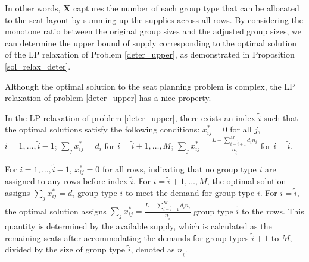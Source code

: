 In other words, $\bm{X}$ captures the number of each group type that can be allocated to the seat layout by summing up the supplies across all rows. By considering the monotone ratio between the original group sizes and the adjusted group sizes, we can determine the upper bound of supply corresponding to the optimal solution of the LP relaxation of Problem \eqref{deter_upper}, as demonstrated in Proposition \ref{sol_relax_deter}.





Although the optimal solution to the seat planning problem is complex, the LP relaxation of problem \eqref{deter_upper} has a nice property.

\begin{prop}\label{sol_relax_deter}
In the LP relaxation of problem \eqref{deter_upper}, there exists an index $\tilde{i}$ such that the optimal solutions satisfy the following conditions: $x_{ij}^{*} = 0$ for all $j$, $i = 1,\ldots, \tilde{i}-1$; $\sum_{j} x_{ij}^{*} = d_{i}$ for $i = \tilde{i}+1,\ldots, M$; $\sum_{j} x_{ij}^{*} = \frac{L - \sum_{i = \tilde{i}+1}^{M} {d_i n_i}}{n_{\tilde{i}}}$ for $i = \tilde{i}$.
\end{prop}


For $i = 1,\ldots, \tilde{i}-1$, $x_{ij}^{*} = 0$ for all rows, indicating that no group type $i$ are assigned to any rows before index $\tilde{i}$. For $i = \tilde{i}+1,\ldots, M$, the optimal solution assigns $\sum_{j} x_{ij}^{*} = d_{i}$ group type $i$ to meet the demand for group type $i$. For $i = \tilde{i}$, the optimal solution assigns $\sum_{j} x_{ij}^{*} = \frac{L - \sum_{i = \tilde{i}+1}^{M} {d_i n_i}}{n_{\tilde{i}}}$ group type $\tilde{i}$ to the rows. This quantity is determined by the available supply, which is calculated as the remaining seats after accommodating the demands for group types $\tilde{i}+1$ to $M$, divided by the size of group type $\tilde{i}$, denoted as $n_{\tilde{i}}$.

